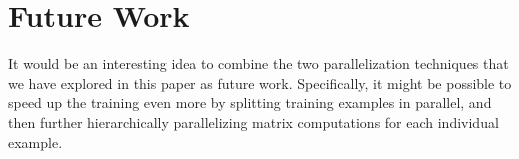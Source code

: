 \section{Future Work}
\label{Future}

It would be an interesting idea to combine the two parallelization techniques that we have explored in this paper as future work.
Specifically, it might be possible to speed up the training even more by splitting training examples in parallel, and then further hierarchically parallelizing matrix computations for each individual example.
